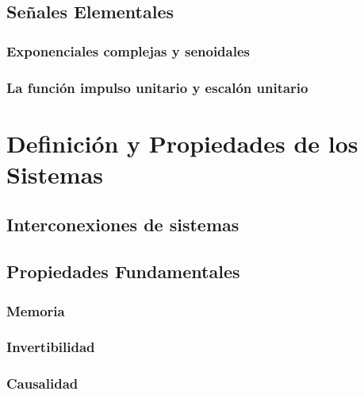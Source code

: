 \documentclass[11pt,a4paper,openany]{book}
\begin{document}
	\section{Señales Elementales}
	
	\subsection{Exponenciales complejas y senoidales}
	
	\subsection{La función impulso unitario y escalón unitario}
	
	
	\chapter{Definición y Propiedades de los Sistemas}
	
	
	\section{Interconexiones de sistemas}
	
	\section{Propiedades Fundamentales}
	
	\subsection{Memoria}
	
	\subsection{Invertibilidad}
	
	\subsection{Causalidad}
	
\end{document}

